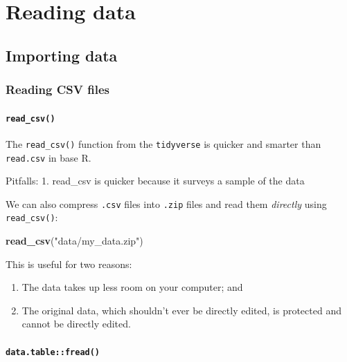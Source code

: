 \documentclass[]{book}
\newenvironment{Shaded}{\begin{snugshade}}{\end{snugshade}}
\newcommand{\KeywordTok}[1]{\textcolor[rgb]{0.13,0.29,0.53}{\textbf{#1}}}
\newcommand{\NormalTok}[1]{#1}
\newcommand{\StringTok}[1]{\textcolor[rgb]{0.31,0.60,0.02}{#1}}
\providecommand{\tightlist}{%
  \setlength{\itemsep}{0pt}\setlength{\parskip}{0pt}}
\begin{document}
\hypertarget{reading-data}{%
\chapter{Reading data}\label{reading-data}}

\hypertarget{importing-data}{%
\section{Importing data}\label{importing-data}}

\hypertarget{reading-csv-files}{%
\subsection{Reading CSV files}\label{reading-csv-files}}

\hypertarget{read_csv}{%
\subsubsection{\texorpdfstring{\texttt{read\_csv()}}{read\_csv()}}\label{read_csv}}

The \texttt{read\_csv()} function from the \texttt{tidyverse} is quicker and smarter than \texttt{read.csv} in base R.

Pitfalls:
1. read\_csv is quicker because it surveys a sample of the data

We can also compress \texttt{.csv} files into \texttt{.zip} files and read them \emph{directly} using \texttt{read\_csv()}:

\begin{Shaded}
\begin{Highlighting}[]
\KeywordTok{read_csv}\NormalTok{(}\StringTok{"data/my_data.zip"}\NormalTok{)}
\end{Highlighting}
\end{Shaded}

This is useful for two reasons:

\begin{enumerate}
\def\labelenumi{\arabic{enumi}.}
\tightlist
\item
  The data takes up less room on your computer; and
\item
  The original data, which shouldn't ever be directly edited, is protected and cannot be directly edited.
\end{enumerate}

\hypertarget{data.tablefread}{%
\subsubsection{\texorpdfstring{\texttt{data.table::fread()}}{data.table::fread()}}\label{data.tablefread}}
\end{document}
